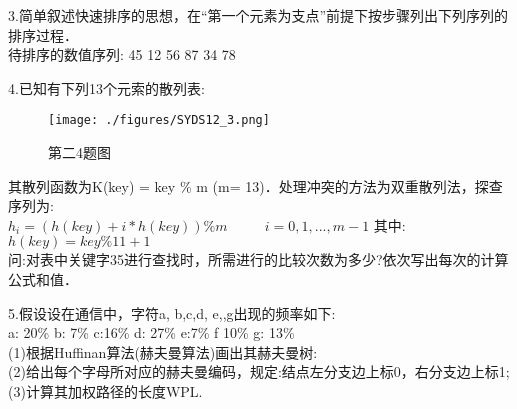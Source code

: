 3.简单叙述快速排序的思想，在“第一个元素为支点”前提下按步骤列出下列序列的排序过程． \\
待排序的数值序列: 45 12 56 87 34 78

4.已知有下列13个元索的散列表:
\begin{figure}[ht]
\centering
\texttt{[image: ./figures/SYDS12\_3.png]}
\caption{第二4题图} \label{SYDS12_fig3}
\end{figure}
其散列函数为K(key) = key \% m (m= 13)．处理冲突的方法为双重散列法，探查序列为:  \\
$h_i=(h(key)+i*h(key))\%m$ $\qquad$ $i=0,1,...,m-1$  其中: $h(key)=key\%11+1$ \\
问:对表中关键字35进行查找时，所需进行的比较次数为多少?依次写出每次的计算公式和值．

5.假设设在通信中，字符a, b,c,d, e,,g出现的频率如下: \\
a: 20\% b: 7\% c:16\% d: 27\% e:7\% f 10\% g: 13\% \\
(1)根据Huffinan算法(赫夫曼算法)画出其赫夫曼树: \\
(2)给出每个字母所对应的赫夫曼编码，规定:结点左分支边上标0，右分支边上标1; \\
(3)计算其加权路径的长度WPL.

